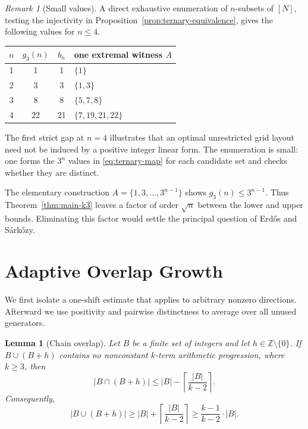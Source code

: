 \documentclass[11pt]{article}
\numberwithin{equation}{section}
\newtheorem{lemma}[theorem]{Lemma}
\theoremstyle{definition}
\theoremstyle{remark}
\newtheorem{remark}[theorem]{Remark}
\newcommand{\Z}{\mathbb{Z}}
\newcommand{\ceil}[1]{\left\lceil #1\right\rceil}
\begin{document}
\begin{remark}[Small values]\label{rem:small-g3-values}
A direct exhaustive enumeration of $n$-subsets of $[N]$, testing the injectivity in Proposition~\ref{prop:ternary-equivalence}, gives the following values for $n\le4$.
\begin{center}
\begin{tabular}{c@{\qquad}c@{\qquad}c@{\qquad}l}
\toprule
$n$ & $g_3(n)$ & $b_n$ & one extremal witness $A$ \\
\midrule
1 & 1  & 1  & $\{1\}$ \\
2 & 3  & 3  & $\{1,3\}$ \\
3 & 8  & 8  & $\{5,7,8\}$ \\
4 & 22 & 21 & $\{7,19,21,22\}$ \\
\bottomrule
\end{tabular}
\end{center}
The first strict gap at $n=4$ illustrates that an optimal unrestricted grid layout need not be induced by a positive integer linear form. The enumeration is small: one forms the $3^n$ values in \eqref{eq:ternary-map} for each candidate set and checks whether they are distinct.
\end{remark}

\smallskip
\noindent
The elementary construction $A=\{1,3,\ldots,3^{n-1}\}$ shows $g_3(n)\le3^{n-1}$. Thus Theorem~\ref{thm:main-k3} leaves a factor of order $\sqrt n$ between the lower and upper bounds. Eliminating this factor would settle the principal question of Erd\H{o}s and S\'ark\H{o}zy.

\section{Adaptive Overlap Growth}\label{sec:adaptive}

We first isolate a one-shift estimate that applies to arbitrary nonzero directions. Afterward we use positivity and pairwise distinctness to average over all unused generators.

\begin{lemma}[Chain overlap]\label{lem:chain-overlap}
Let $B$ be a finite set of integers and let $h\in\Z\setminus\{0\}$. If $B\cup(B+h)$ contains no nonconstant $k$-term arithmetic progression, where $k\ge3$, then
\begin{equation}\label{eq:chain-overlap}
|B\cap(B+h)|\le |B|-\ceil{\frac{|B|}{k-2}}.
\end{equation}
Consequently,
\begin{equation}\label{eq:chain-expansion}
|B\cup(B+h)|
 \ge |B|+\ceil{\frac{|B|}{k-2}}
 \ge\frac{k-1}{k-2}\cdot|B|.
\end{equation}
\end{lemma}
\end{document}
